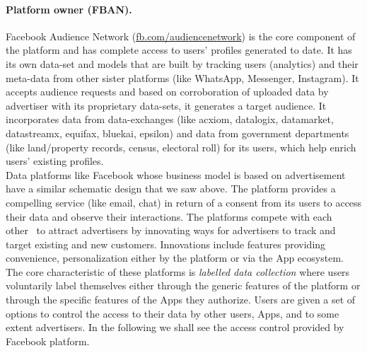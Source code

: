 \documentclass[runningheads]{llncs}
\begin{document}
\paragraph{Platform owner (FBAN).}
Facebook Audience Network (\url{fb.com/audiencenetwork}) is the core
component of the platform and has complete access to users' profiles
generated to date. It has its own data-set and models that are built
by tracking users (analytics) and their meta-data from other sister
platforms (like WhatsApp, Messenger, Instagram). It accepts audience
requests and based on corroboration of uploaded data by advertiser
with its proprietary data-sets, it generates a target audience. It
incorporates data from data-exchanges (like acxiom, datalogix, datamarket, datastreamx,
equifax, bluekai, epsilon) and data from government departments (like
land/property records, census, electoral roll) for its users, which
help enrich users' existing profiles.\\

\noindent Data platforms like Facebook whose business model is based
on advertisement have a similar schematic design that we saw
above. The platform provides a compelling service (like email, chat)
in return of a consent from its users to access their data and observe
their interactions. The platforms compete with each
other~\cite{data-goliath} to attract advertisers by innovating ways
for advertisers to track and target existing and new
customers. Innovations include features providing convenience,
personalization either by the platform or via the App ecosystem. The
core characteristic of these platforms is \textit{labelled data
  collection} where users voluntarily label themselves either through
the generic features of the platform or through the specific features
of the Apps they authorize. Users are given a set of options to
control the access to their data by other users, Apps, and to some
extent advertisers. In the following we shall see the access control
provided by Facebook platform.
\end{document}
